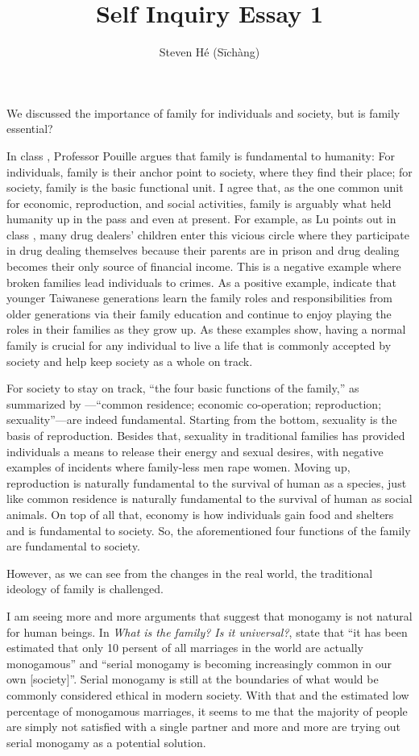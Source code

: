 \documentclass[12pt]{article}
\title{Self Inquiry Essay 1}
\author{Steven Hé (Sīchàng)}
\begin{document}
\maketitle
We discussed the importance of family for individuals and society,
but is family essential?

In class \citep{pouille2023ethics},
Professor Pouille argues that family is fundamental to humanity:
For individuals, family is their anchor point to society,
where they find their place;
for society, family is the basic functional unit.
I agree that, as the one common unit for economic, reproduction, and social
activities, family is arguably what held humanity up in the pass and even at
present.
For example, as Lu points out in class \citep{pouille2023ethics},
many drug dealers' children enter this vicious circle where
they participate in drug dealing themselves because their parents are in prison
and drug dealing becomes their only source of financial income.
This is a negative example where broken families lead individuals to crimes.
As a positive example, \citet{lu1998family} indicate that
younger Taiwanese generations learn the family roles and responsibilities from
older generations via their family education and
continue to enjoy playing the roles in their families as they grow up.
As these examples show, having a normal family is crucial for any individual to
live a life that is commonly accepted by society and help keep society as a
whole on track.

For society to stay on track, ``the four basic functions of the family,''
as summarized by \citet[p. 60]{gittins1993family}—``common residence;
economic co-operation; reproduction; sexuality''—are indeed fundamental.
Starting from the bottom, sexuality is the basis of reproduction.
Besides that, sexuality in traditional families has provided individuals
a means to release their energy and sexual desires,
with negative examples of incidents where family-less men rape women.
Moving up, reproduction is naturally fundamental to the survival of human as
a species, just like common residence is naturally fundamental to the survival
of human as social animals.
On top of all that, economy is how individuals gain food and shelters and
is fundamental to society.
So, the aforementioned four functions of the family are fundamental to society.

However, as we can see from the changes in the real world,
the traditional ideology of family is challenged.

I am seeing more and more arguments that suggest that monogamy is not natural
for human beings.
In \textit{What is the family? Is it universal?}, \citet[p. 63]{gittins1993family}
state that ``it has been estimated that only 10 persent of all
marriages in the world are actually monogamous'' and
``serial monogamy is becoming increasingly common in our own [society]''.
Serial monogamy is still at the boundaries of what would be commonly considered
ethical in modern society.
With that and the estimated low percentage of monogamous marriages,
it seems to me that the majority of people are simply not satisfied with a
single partner and
more and more are trying out serial monogamy as a potential solution.
\end{document}
